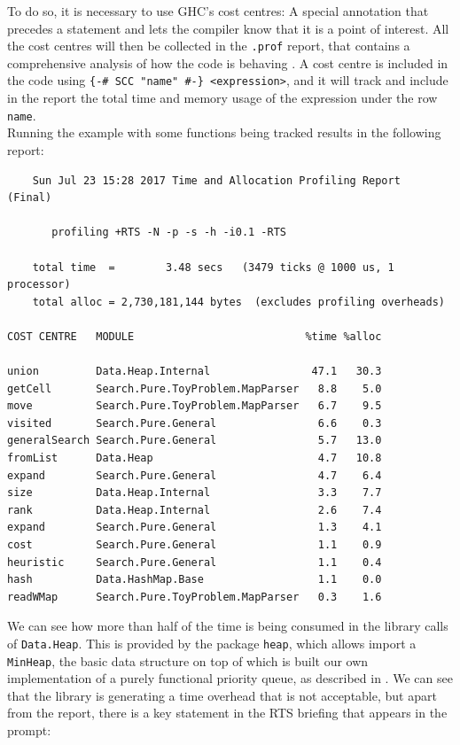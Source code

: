 To do so, it is necessary to use GHC's cost centres: A special annotation that
precedes a statement and lets the compiler know that it is a point of interest.
All the cost centres will then be collected in the \texttt{.prof} report, that
contains a comprehensive analysis of how the code is behaving \cite{ghc}. A
cost centre is included in the code using \texttt{\{-\# SCC "name" \#-\}
  <expression>}, and it will track and include in the report the total time and
memory usage of the expression under the row \texttt{name}.\\

Running the example with some functions being tracked results in the following
report:\\

\begin{lstlisting}
	Sun Jul 23 15:28 2017 Time and Allocation Profiling Report  (Final)

	   profiling +RTS -N -p -s -h -i0.1 -RTS

	total time  =        3.48 secs   (3479 ticks @ 1000 us, 1 processor)
	total alloc = 2,730,181,144 bytes  (excludes profiling overheads)

COST CENTRE   MODULE                           %time %alloc

union         Data.Heap.Internal                47.1   30.3
getCell       Search.Pure.ToyProblem.MapParser   8.8    5.0
move          Search.Pure.ToyProblem.MapParser   6.7    9.5
visited       Search.Pure.General                6.6    0.3
generalSearch Search.Pure.General                5.7   13.0
fromList      Data.Heap                          4.7   10.8
expand        Search.Pure.General                4.7    6.4
size          Data.Heap.Internal                 3.3    7.7
rank          Data.Heap.Internal                 2.6    7.4
expand        Search.Pure.General                1.3    4.1
cost          Search.Pure.General                1.1    0.9
heuristic     Search.Pure.General                1.1    0.4
hash          Data.HashMap.Base                  1.1    0.0
readWMap      Search.Pure.ToyProblem.MapParser   0.3    1.6
\end{lstlisting}

We can see how more than half of the time is being consumed in the library
calls of \texttt{Data.Heap}. This is provided by the package \texttt{heap},
which allows import a \texttt{MinHeap}, the basic data structure on top of
which is built our own implementation of a purely functional priority queue,
as described in \cite{okasaki-1999-purely}. We can see that the library is
generating a time overhead that is not acceptable, but apart from the report,
there is a key statement in the RTS briefing that appears in the prompt:\\

